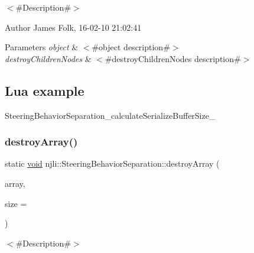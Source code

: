 $<$\#\+Description\#$>$ 

\begin{DoxyAuthor}{Author}
James Folk, 16-\/02-\/10 21\+:02\+:41
\end{DoxyAuthor}

\begin{DoxyParams}{Parameters}
{\em object} & $<$\#object description\#$>$ \\
\hline
{\em destroy\+Children\+Nodes} & $<$\#destroy\+Children\+Nodes description\#$>$\\
\hline
\end{DoxyParams}
\hypertarget{classnjli_1_1_steering_behavior_wander_ex1}{}\subsection{Lua example}\label{classnjli_1_1_steering_behavior_wander_ex1}

\begin{DoxyCodeInclude}
\end{DoxyCodeInclude}
Steering\+Behavior\+Separation\+\_\+calculate\+Serialize\+Buffer\+Size\+\_\+ \mbox{\label{classnjli_1_1_steering_behavior_separation_adc9ee8ea5b10f393f864292018b15196}} 
\subsubsection{\texorpdfstring{destroy\+Array()}{destroyArray()}}
{\footnotesize\ttfamily static \mbox{\hyperlink{_thread_8h_af1e856da2e658414cb2456cb6f7ebc66}{void}} njli\+::\+Steering\+Behavior\+Separation\+::destroy\+Array (\begin{DoxyParamCaption}\item[{\mbox{\hyperlink{classnjli_1_1_steering_behavior_separation}{Steering\+Behavior\+Separation}} $\ast$$\ast$}]{array,  }\item[{const \mbox{\hyperlink{_util_8h_a10e94b422ef0c20dcdec20d31a1f5049}{u32}}}]{size = {} }\end{DoxyParamCaption})\hspace{0.3cm}{\ttfamily [static]}}



$<$\#\+Description\#$>$ 

